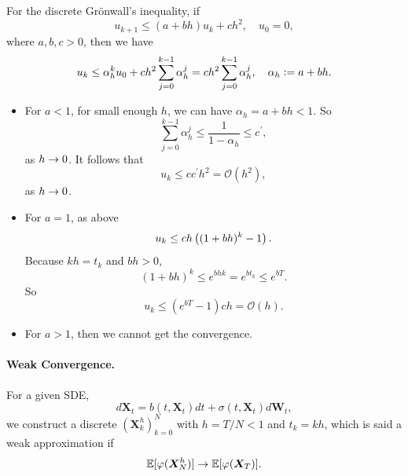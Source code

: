 \begin{rmk}
    For the discrete Gr\"onwall's inequality, if 
    \begin{equation*}
        u_{k+1} \leq (a + bh)u_k + ch^2,\quad u_0 = 0,
    \end{equation*}
    where $a,b,c > 0$, then we have
    \begin{equation*}
        u_k \leq  \alpha_h^k u_0+c h^2 \sum_{j=0}^{k-1} \alpha_h^j = c h^2 \sum_{j=0}^{k-1} \alpha_h^j,\quad \alpha_h \vcentcolon= a + bh.
    \end{equation*}
    \begin{itemize}
        \item For $a < 1$, for small enough $h$, we can have $\alpha_h = a + bh < 1$. So
        \begin{equation*}
            \sum_{j=0}^{k-1} \alpha_h^j \leq \frac{1}{1-\alpha_h} \leq c^\prime,
        \end{equation*}
        as $h \rightarrow 0$. It follows that
        \begin{equation*}
            u_k \leq c c^\prime h^2 = \mathcal{O}(h^2),
        \end{equation*}
        as $h \rightarrow 0$.

        \item For $a = 1$, as above
        \begin{equation*}
            u_k \leq ch\left((1+bh)^k - 1\right).
        \end{equation*}
        Because $kh = t_k$ and $bh > 0$,
        \begin{equation*}
            (1+b h)^k \leq e^{b h k}=e^{b t_k} \leq e^{b T}.
        \end{equation*}
        So
        \begin{equation*}
            u_k \leq (e^{bT} - 1)ch = \mathcal{O}(h).
        \end{equation*}

        \item For $a > 1$, then we cannot get the convergence.
    \end{itemize}
\end{rmk}

\paragraph{Weak Convergence.} For a given SDE,
\begin{equation*}
    d\bm{X}_t = b(t,\bm{X}_t)dt+\sigma(t,\bm{X}_t)d\bm{W}_t,
\end{equation*}
we construct a discrete $(\bm{X}^h_k)_{k=0}^N$ with $h = T /N < 1$ and $t_k = kh$, which is said a weak approximation if 
\begin{equation*}
    \mathbb{E}[\varphi(\bm{X}^h_N)] \rightarrow \mathbb{E}[\varphi(\bm{X}_T)].
\end{equation*}

